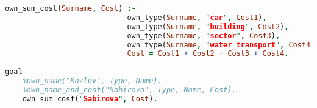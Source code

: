 \documentclass[12pt]{report}
\begin{document}
\begin{lstlisting}[language=Prolog]
	own_sum_cost(Surname, Cost) :- 
                            own_type(Surname, "car", Cost1),
                            own_type(Surname, "building", Cost2),
                            own_type(Surname, "sector", Cost3),
                            own_type(Surname, "water_transport", Cost4),
                            Cost = Cost1 + Cost2 + Cost3 + Cost4.
				       
goal
	%own_name("Kozlov", Type, Name).
	%own_name_and_cost("Sabirova", Type, Name, Cost).
	own_sum_cost("Sabirova", Cost).
\end{lstlisting}



	
\end{document}
